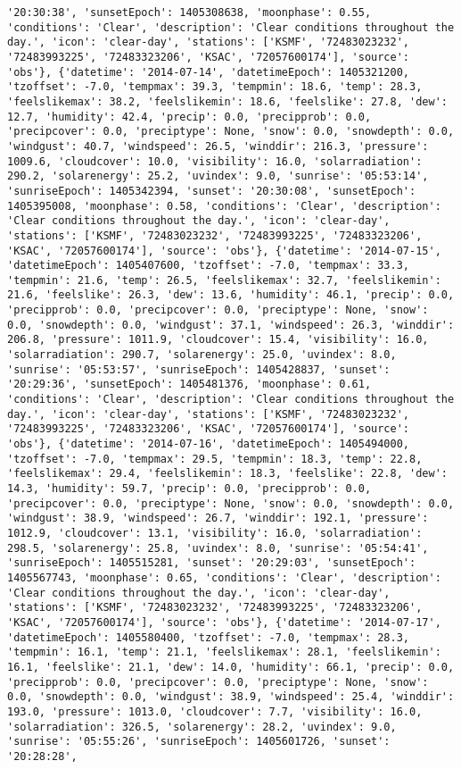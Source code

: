 \documentclass[
  letterpaper,
  DIV=11,
  numbers=noendperiod]{scrartcl}
\begin{document}
\begin{verbatim}
'20:30:38', 'sunsetEpoch': 1405308638, 'moonphase': 0.55, 'conditions': 'Clear', 'description': 'Clear conditions throughout the day.', 'icon': 'clear-day', 'stations': ['KSMF', '72483023232', '72483993225', '72483323206', 'KSAC', '72057600174'], 'source': 'obs'}, {'datetime': '2014-07-14', 'datetimeEpoch': 1405321200, 'tzoffset': -7.0, 'tempmax': 39.3, 'tempmin': 18.6, 'temp': 28.3, 'feelslikemax': 38.2, 'feelslikemin': 18.6, 'feelslike': 27.8, 'dew': 12.7, 'humidity': 42.4, 'precip': 0.0, 'precipprob': 0.0, 'precipcover': 0.0, 'preciptype': None, 'snow': 0.0, 'snowdepth': 0.0, 'windgust': 40.7, 'windspeed': 26.5, 'winddir': 216.3, 'pressure': 1009.6, 'cloudcover': 10.0, 'visibility': 16.0, 'solarradiation': 290.2, 'solarenergy': 25.2, 'uvindex': 9.0, 'sunrise': '05:53:14', 'sunriseEpoch': 1405342394, 'sunset': '20:30:08', 'sunsetEpoch': 1405395008, 'moonphase': 0.58, 'conditions': 'Clear', 'description': 'Clear conditions throughout the day.', 'icon': 'clear-day', 'stations': ['KSMF', '72483023232', '72483993225', '72483323206', 'KSAC', '72057600174'], 'source': 'obs'}, {'datetime': '2014-07-15', 'datetimeEpoch': 1405407600, 'tzoffset': -7.0, 'tempmax': 33.3, 'tempmin': 21.6, 'temp': 26.5, 'feelslikemax': 32.7, 'feelslikemin': 21.6, 'feelslike': 26.3, 'dew': 13.6, 'humidity': 46.1, 'precip': 0.0, 'precipprob': 0.0, 'precipcover': 0.0, 'preciptype': None, 'snow': 0.0, 'snowdepth': 0.0, 'windgust': 37.1, 'windspeed': 26.3, 'winddir': 206.8, 'pressure': 1011.9, 'cloudcover': 15.4, 'visibility': 16.0, 'solarradiation': 290.7, 'solarenergy': 25.0, 'uvindex': 8.0, 'sunrise': '05:53:57', 'sunriseEpoch': 1405428837, 'sunset': '20:29:36', 'sunsetEpoch': 1405481376, 'moonphase': 0.61, 'conditions': 'Clear', 'description': 'Clear conditions throughout the day.', 'icon': 'clear-day', 'stations': ['KSMF', '72483023232', '72483993225', '72483323206', 'KSAC', '72057600174'], 'source': 'obs'}, {'datetime': '2014-07-16', 'datetimeEpoch': 1405494000, 'tzoffset': -7.0, 'tempmax': 29.5, 'tempmin': 18.3, 'temp': 22.8, 'feelslikemax': 29.4, 'feelslikemin': 18.3, 'feelslike': 22.8, 'dew': 14.3, 'humidity': 59.7, 'precip': 0.0, 'precipprob': 0.0, 'precipcover': 0.0, 'preciptype': None, 'snow': 0.0, 'snowdepth': 0.0, 'windgust': 38.9, 'windspeed': 26.7, 'winddir': 192.1, 'pressure': 1012.9, 'cloudcover': 13.1, 'visibility': 16.0, 'solarradiation': 298.5, 'solarenergy': 25.8, 'uvindex': 8.0, 'sunrise': '05:54:41', 'sunriseEpoch': 1405515281, 'sunset': '20:29:03', 'sunsetEpoch': 1405567743, 'moonphase': 0.65, 'conditions': 'Clear', 'description': 'Clear conditions throughout the day.', 'icon': 'clear-day', 'stations': ['KSMF', '72483023232', '72483993225', '72483323206', 'KSAC', '72057600174'], 'source': 'obs'}, {'datetime': '2014-07-17', 'datetimeEpoch': 1405580400, 'tzoffset': -7.0, 'tempmax': 28.3, 'tempmin': 16.1, 'temp': 21.1, 'feelslikemax': 28.1, 'feelslikemin': 16.1, 'feelslike': 21.1, 'dew': 14.0, 'humidity': 66.1, 'precip': 0.0, 'precipprob': 0.0, 'precipcover': 0.0, 'preciptype': None, 'snow': 0.0, 'snowdepth': 0.0, 'windgust': 38.9, 'windspeed': 25.4, 'winddir': 193.0, 'pressure': 1013.0, 'cloudcover': 7.7, 'visibility': 16.0, 'solarradiation': 326.5, 'solarenergy': 28.2, 'uvindex': 9.0, 'sunrise': '05:55:26', 'sunriseEpoch': 1405601726, 'sunset': '20:28:28', 
\end{verbatim}
\end{document}
